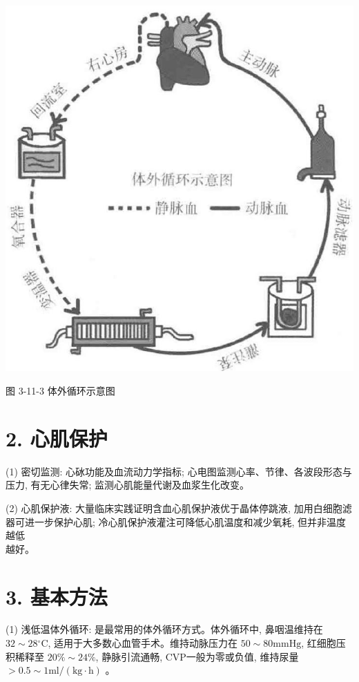 \documentclass[10pt]{article}
\begin{document}
\begin{center}
\includegraphics[max width=\textwidth]{2024_07_05_645bb794a4d4f32ee0c8g-241}
\end{center}

图 3-11-3 体外循环示意图

\section*{2. 心肌保护}
(1) 密切监测: 心砅功能及血流动力学指标; 心电图监测心率、节律、各波段形态与压力, 有无心律失常; 监测心肌能量代谢及血浆生化改变。

(2) 心肌保护液: 大量临床实践证明含血心肌保护液优于晶体停跳液, 加用白细胞滤器可进一步保护心肌; 冷心肌保护液灌注可降低心肌温度和减少氧耗, 但并非温度越低\\
越好。

\section*{3. 基本方法}
(1) 浅低温体外循环: 是最常用的体外循环方式。体外循环中, 鼻咽温维持在 $32 \sim 28{ }^{\circ} \mathrm{C}$, 适用于大多数心血管手术。维持动脉压力在 $50 \sim 80 \mathrm{mmHg}$, 红细胞压积稀释至 $20 \% \sim 24 \%$, 静脉引流通畅, CVP一般为零或负值, 维持尿量 $>0.5 \sim 1 \mathrm{ml} /(\mathrm{kg} \cdot \mathrm{h})$ 。
\end{document}
